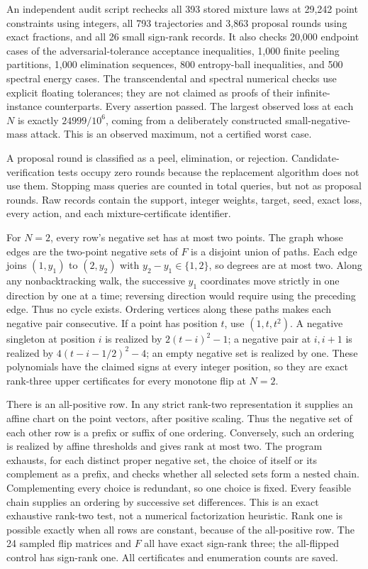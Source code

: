\documentclass[11pt]{article}
\newcommand{\1}{\mathbf 1}
\begin{document}


An independent audit script rechecks all 393 stored mixture laws at 29,242 point constraints using integers, all 793 trajectories and 3,863 proposal rounds using exact fractions, and all 26 small sign-rank records. It also checks 20,000 endpoint cases of the adversarial-tolerance acceptance inequalities, 1,000 finite peeling partitions, 1,000 elimination sequences, 800 entropy-ball inequalities, and 500 spectral energy cases. The transcendental and spectral numerical checks use explicit floating tolerances; they are not claimed as proofs of their infinite-instance counterparts. Every assertion passed. The largest observed loss at each $N$ is exactly $24999/10^6$, coming from a deliberately constructed small-negative-mass attack. This is an observed maximum, not a certified worst case.

A proposal round is classified as a peel, elimination, or rejection. Candidate-verification tests occupy zero rounds because the replacement algorithm does not use them. Stopping mass queries are counted in total queries, but not as proposal rounds. Raw records contain the support, integer weights, target, seed, exact loss, every action, and each mixture-certificate identifier.

For $N=2$, every row's negative set has at most two points. The graph whose edges are the two-point negative sets of $F$ is a disjoint union of paths. Each edge joins $(1,y_1)$ to $(2,y_2)$ with $y_2-y_1\in\{1,2\}$, so degrees are at most two. Along any nonbacktracking walk, the successive $y_1$ coordinates move strictly in one direction by one at a time; reversing direction would require using the preceding edge. Thus no cycle exists. Ordering vertices along these paths makes each negative pair consecutive. If a point has position $t$, use $(1,t,t^2)$. A negative singleton at position $i$ is realized by $2(t-i)^2-1$; a negative pair at $i,i+1$ is realized by $4(t-i-1/2)^2-4$; an empty negative set is realized by one. These polynomials have the claimed signs at every integer position, so they are exact rank-three upper certificates for every monotone flip at $N=2$.

There is an all-positive row. In any strict rank-two representation it supplies an affine chart on the point vectors, after positive scaling. Thus the negative set of each other row is a prefix or suffix of one ordering. Conversely, such an ordering is realized by affine thresholds and gives rank at most two. The program exhausts, for each distinct proper negative set, the choice of itself or its complement as a prefix, and checks whether all selected sets form a nested chain. Complementing every choice is redundant, so one choice is fixed. Every feasible chain supplies an ordering by successive set differences. This is an exact exhaustive rank-two test, not a numerical factorization heuristic. Rank one is possible exactly when all rows are constant, because of the all-positive row. The 24 sampled flip matrices and $F$ all have exact sign-rank three; the all-flipped control has sign-rank one. All certificates and enumeration counts are saved.
\end{document}
